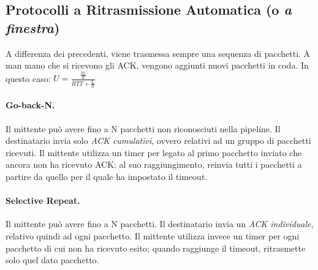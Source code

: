 \subsection{Protocolli a Ritrasmissione Automatica (o \textit{a finestra})}
A differenza dei precedenti, viene trasmessa sempre una sequenza di pacchetti. A man mano che si ricevono gli ACK, vengono aggiunti nuovi pacchetti in coda.
In questo caso: $ U = \frac{\frac{3L}{R}}{RTT + \frac{L}{R}} $ \\
\paragraph{Go-back-N.} Il mittente può avere fino a N pacchetti non riconosciuti nella pipeline. Il destinatario invia solo \textit{ACK cumulativi}, ovvero relativi ad un gruppo di pacchetti ricevuti. Il mittente utilizza un timer per legato al primo pacchetto inviato che ancora non ha ricevuto ACK: al suo raggiungimento, reinvia tutti i pacchetti a partire da quello per il quale ha impostato il timeout.
\paragraph{Selective Repeat.} Il mittente può avere fino a N pacchetti. Il destinatario invia un \textit{ACK individuale}, relativo quindi ad ogni pacchetto. Il mittente utilizza invece un timer per ogni pacchetto di cui non ha ricevuto esito; quando raggiunge il timeout, ritrasmette solo quel dato pacchetto.

